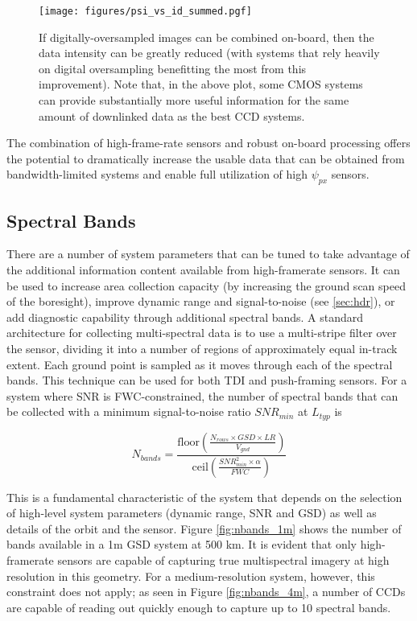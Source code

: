 \documentclass[]{spieman}  %
\begin{document}
\begin{figure}
  \centering
  \texttt{[image: figures/psi\_vs\_id\_summed.pgf]}
  \caption{If digitally-oversampled images can be combined on-board, then the data intensity can be greatly reduced (with systems that rely heavily on digital oversampling benefitting the most from this improvement). Note that, in the above plot, some CMOS systems can provide substantially more useful information for the same amount of downlinked data as the best CCD systems.
  \label{fig:psi_vs_id_summed}}
\end{figure}

The combination of high-frame-rate sensors and robust on-board processing offers the potential to dramatically increase the usable data that can be obtained from bandwidth-limited systems and enable full utilization of high $\psi_{px}$ sensors.

\subsection{Spectral Bands}
\label{sec:spec}

There are a number of system parameters that can be tuned to take advantage of the additional information content available from high-framerate sensors. It can be used to increase area collection capacity (by increasing the ground scan speed of the boresight), improve dynamic range and signal-to-noise (see \ref{sec:hdr}), or add diagnostic capability through additional spectral bands. A standard architecture for collecting multi-spectral data is to use a multi-stripe filter over the sensor, dividing it into a number of regions of approximately equal in-track extent. Each ground point is sampled as it moves through each of the spectral bands. This technique can be used for both TDI and push-framing sensors. For a system where SNR is FWC-constrained, the number of spectral bands that can be collected with a minimum signal-to-noise ratio $SNR_{min}$ at $L_{typ}$ is

\begin{equation}
    \label{eq:nbands}
    N_{bands} = \frac{\text{floor}\left(\frac{N_{rows}\times GSD\times LR}{V_{gnd}}\right)} {\text{ceil}\left(\frac{SNR_{min}^{2}\times\alpha}{FWC}\right)}
\end{equation}

This is a fundamental characteristic of the system that depends on the selection of high-level system parameters (dynamic range, SNR and GSD) as well as details of the orbit and the sensor. Figure \ref{fig:nbands_1m} shows the number of bands available in a 1m GSD system at 500 km. It is evident that only high-framerate sensors are capable of capturing true multispectral imagery at high resolution in this geometry. For a medium-resolution system, however, this constraint does not apply; as seen in Figure \ref{fig:nbands_4m}, a number of CCDs are capable of reading out quickly enough to capture up to 10 spectral bands.
\end{document}
